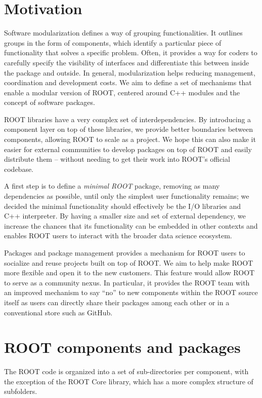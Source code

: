\documentclass{webofc}
\begin{document}
\section{Motivation}

Software modularization defines a way of grouping functionalities. It outlines groups in the form of components, which identify a particular piece of functionality that solves a specific problem.  Often, it provides a way for coders to carefully specify the visibility of interfaces and differentiate this between inside the package and outside.  In general, modularization helps reducing management, coordination and development costs. We aim to define a set of mechanisms that enable a modular version of ROOT, centered around C++ modules \cite{rootcxxmodules} and the concept of software packages.

ROOT libraries have a very complex set of interdependencies. By introducing a component layer on top of these libraries, we provide better boundaries between components, allowing ROOT to scale as a project. We hope this can also make it easier for external communities to develop packages on top of ROOT and easily distribute them -- without needing to get their work into ROOT's official codebase. 

 A first step is to define a \textit{minimal ROOT} package, removing as many dependencies as possible, until only the simplest user functionality remains; we decided the minimal functionality should effectively be the I/O libraries and C++ interpreter. By having a smaller size and set of external dependency, we increase the chances that its functionality can be embedded in other contexts and enables ROOT users to interact with the broader data science ecosystem.

Packages and package management provides a mechanism for ROOT users to socialize and reuse projects built on top of ROOT. We aim to help make ROOT more flexible and open it to the new customers. This feature would allow ROOT to  serve as a community nexus. In particular, it provides the ROOT team with an improved mechanism to say “no” to new components within the ROOT source itself as users can directly share their packages among each other or in a conventional store such as GitHub.

\section{ROOT components and packages}

The ROOT code \cite{rootgit} is organized into a set of sub-directories per component, with the exception of the ROOT Core library, which has a more complex structure of subfolders.
\end{document}

